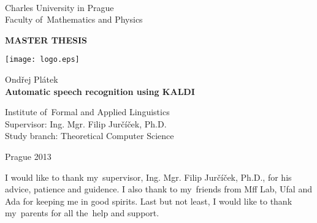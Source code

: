 
\begin{titlepage}
\begin{center}
\ \\

\vspace{15mm}

\large
Charles University in Prague\\
Faculty of~Mathematics and Physics\\

\vspace{5mm}

{\Large\bf MASTER THESIS}

\vspace{15mm}

\texttt{[image: logo.eps]} %

\vspace{20mm}
{\Large Ondřej Plátek}\\ 

\vspace{5mm}
{\Large\bf Automatic speech recognition using KALDI}

\vspace{20mm}
\large
\noindent
Institute of~Formal and Applied Linguistics\\
\noindent
Supervisor: Ing. Mgr. Filip Jurčíček, Ph.D.\\
\noindent
Study branch: Theoretical Computer Science\\
\end{center}
\vspace{20mm}
\begin{center}
Prague 2013
\end{center}

\end{titlepage} %

\newpage

\normalsize %
\vspace{10mm} 

\noindent I would like to thank my~supervisor, Ing. Mgr. Filip Jurčíček, Ph.D., for his advice, patience and guidence. I also thank to my~friends from Mff Lab, Ufal and Ada for keeping me in good spirits. Last but not least, I would like to thank my~parents for all the~help and support.


